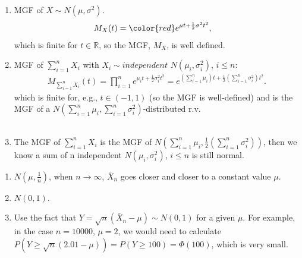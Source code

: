 \begin{Solution}{1.23}
		\begin{enumerate}
					\item MGF of $X \sim N(\mu,\sigma^2)$.
			\begin{align*}
				{ M_X(t)}& =  {\color{red}e^{\mu t + \frac{1}{2}\sigma^2 t^2}},
			\end{align*}  {which is finite for $t\in \mathbb{R}$, so the MGF,  $M_X$, is well defined.}
			\item MGF of $\sum_{i=1}^{n} X_i$ with $X_i\sim \textit{independent }N(\mu_i,\sigma^2_i)$, $i\leq n$:
			\begin{align*}
				M_{\sum_{i=1}^{n}X_i}(t) =\prod_{i=1}^{n} e^{\mu_i t + \frac{1}{2}\sigma_i^2 t^2}=e^{\left(\sum_{i=1}^{n} \mu_i\right) t + \frac{1}{2}\left(\sum_{i=1}^{n}\sigma_i^2\right) t^2 }.
			\end{align*}
			which is finite for, e.g., $t\in (-1, 1)$ (so the MGF is well-defined) and is the MGF of a $N\left(\sum_{i=1}^{n}\mu_i, \sum_{i=1}^{n}\sigma_i^2 \right)$-distributed r.v. \\~\\
			\item The MGF of   $\sum_{i=1}^{n} X_i$ is  the MGF of $N\left(\sum_{i=1}^{n}\mu_i, \frac{1}{2}\left(\sum_{i=1}^{n}\sigma_i^2\right)\right)$, then we know a  sum of n independent $N(\mu_i,\sigma^2_i)$, $i\leq n$ is still normal.
		\end{enumerate}
	
\end{Solution}
\begin{Solution}{1.24}
		\begin{enumerate}
			\item $N(\mu, \frac{1}{n})$, when $n\rightarrow \infty$, $\bar{X}_n$ goes closer and closer to a constant value $\mu$.
			\item $N(0,1)$.
			\item Use the fact that  $Y=\sqrt{n}(\bar{X}_n-\mu)\sim N(0,1)$ for a given $\mu$. For example, in the case $n=10000$, $\mu=2$, we would need to calculate $P(Y\geq \sqrt{n}(2.01-\mu))=P(Y\geq 100)=\Phi(100)$, which is very small.
		\end{enumerate}
	
\end{Solution}
